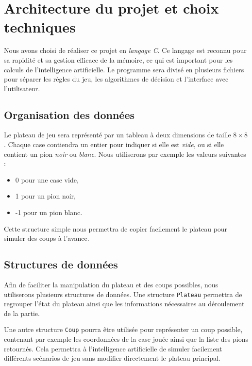 \documentclass{article}
\begin{document}
\section{\textbf{Architecture du projet et choix techniques}}

Nous avons choisi de réaliser ce projet en \emph{langage C}. Ce langage est reconnu pour sa rapidité et sa gestion efficace de la mémoire, ce qui est important pour les calculs de l'intelligence artificielle. Le programme sera divisé en plusieurs fichiers pour séparer les règles du jeu, les algorithmes de décision et l'interface avec l'utilisateur.

\subsection{Organisation des données}

Le plateau de jeu sera représenté par un tableau à deux dimensions de taille $8 \times 8$. Chaque case contiendra un entier pour indiquer si elle est \emph{vide}, ou si elle contient un pion \emph{noir} ou \emph{blanc}. 
Nous utiliserons par exemple les valeurs suivantes :

\begin{itemize}
  \item 0 pour une case vide,
  \item 1 pour un pion noir,
  \item -1 pour un pion blanc.
\end{itemize}

Cette structure simple nous permettra de copier facilement le plateau pour simuler des coups à l'avance.

\subsection{Structures de données}

Afin de faciliter la manipulation du plateau et des coups possibles, nous utiliserons plusieurs structures de données. Une structure \texttt{Plateau} permettra de regrouper l'état du plateau ainsi que les informations nécessaires au déroulement de la partie.

Une autre structure \texttt{Coup} pourra être utilisée pour représenter un coup possible, contenant par exemple les coordonnées de la case jouée ainsi que la liste des pions retournés. Cela permettra à l'intelligence artificielle de simuler facilement différents scénarios de jeu sans modifier directement le plateau principal.
\end{document}
